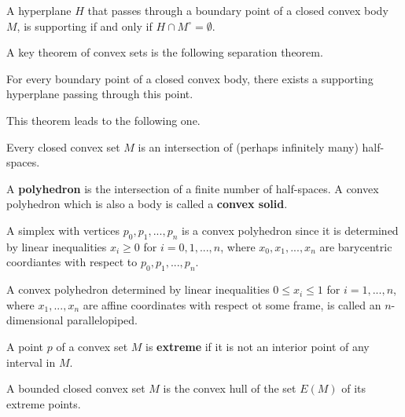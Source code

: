   \begin{proposition}
    A hyperplane $H$ that passes through a boundary point of a closed convex body $M$, is supporting if and only if $H \cap M^\circ = \emptyset$. 
  \end{proposition}

  A key theorem of convex sets is the following separation theorem. 

  \begin{theorem}
    For every boundary point of a closed convex body, there exists a supporting hyperplane passing through this point. 
  \end{theorem}

  This theorem leads to the following one. 

  \begin{theorem}
    Every closed convex set $M$ is an intersection of (perhaps infinitely many) half-spaces. 
  \end{theorem}

  \begin{definition}
    A \textbf{polyhedron} is the intersection of a finite number of half-spaces. A convex polyhedron which is also a body is called a \textbf{convex solid}. 
  \end{definition}

  \begin{example}
    A simplex with vertices $p_0, p_1, ..., p_n$ is a convex polyhedron since it is determined by linear inequalities $x_i \geq 0$ for $i = 0, 1, ..., n$, where $x_0, x_1, ..., x_n$ are barycentric coordiantes with respect to $p_0, p_1,..., p_n$. 
  \end{example}

  \begin{example}
    A convex polyhedron determined by linear inequalities $0 \leq x_i \leq 1$ for $i = 1, ..., n$, where $x_1,..., x_n$ are affine coordinates with respect ot some frame, is called an $n$-dimensional parallelopiped. 
  \end{example}

  \begin{definition}
    A point $p$ of a convex set $M$ is \textbf{extreme} if it is not an interior point of any interval in $M$. 
  \end{definition}

  \begin{theorem}
    A bounded closed convex set $M$ is the convex hull of the set $E(M)$ of its extreme points. 
  \end{theorem}

